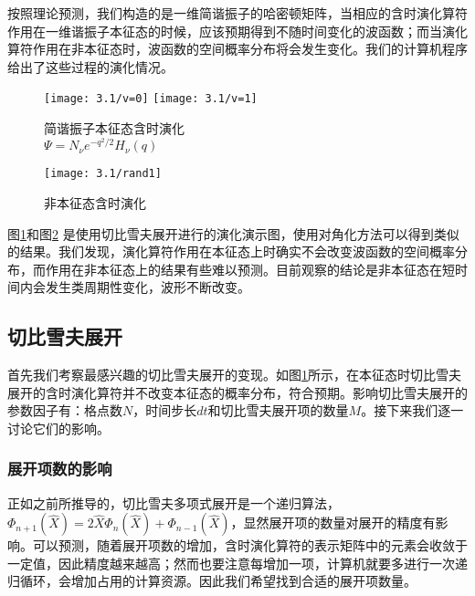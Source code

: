 按照理论预测，我们构造的是一维简谐振子的哈密顿矩阵，当相应的含时演化算符作用在一维谐振子本征态的时候，应该预期得到不随时间变化的波函数；而当演化算符作用在非本征态时，波函数的空间概率分布将会发生变化。我们的计算机程序给出了这些过程的演化情况。
\begin{figure}[hbt]
  \centering
  \captionsetup{justification=centering}
  \vspace{1mm}
  \texttt{[image: 3.1/v=0]}
  \texttt{[image: 3.1/v=1]}
  \caption{简谐振子本征态含时演化 \\
            $\Psi = N_{\nu}e^{-q^2/2}H_{\nu}(q)$ \label{fig:prop1}}
\end{figure}

\begin{figure}[hbt]
  \centering
  \captionsetup{justification=centering}
  \vspace{1mm}
  \texttt{[image: 3.1/rand1]}
  \caption{非本征态含时演化  \label{fig:prop2}}
\end{figure}

图\ref{fig:prop1}和图\ref{fig:prop2} 是使用切比雪夫展开进行的演化演示图，使用对角化方法可以得到类似的结果。我们发现，演化算符作用在本征态上时确实不会改变波函数的空间概率分布，而作用在非本征态上的结果有些难以预测。目前观察的结论是非本征态在短时间内会发生类周期性变化，波形不断改变。

\subsection{切比雪夫展开}
首先我们考察最感兴趣的切比雪夫展开的变现。如图\ref{fig:prop1}所示，在本征态时切比雪夫展开的含时演化算符并不改变本征态的概率分布，符合预期。影响切比雪夫展开的参数因子有：格点数$N$，时间步长$dt$和切比雪夫展开项的数量$M$。接下来我们逐一讨论它们的影响。

\subsubsection{展开项数的影响}
正如之前所推导的，切比雪夫多项式展开是一个递归算法，$\Phi_{n+1}(\hat{X}) = 2\hat{X}\Phi_{n}(\hat{X}) + \Phi_{n-1}(\hat{X})$，显然展开项的数量对展开的精度有影响。可以预测，随着展开项数的增加，含时演化算符的表示矩阵中的元素会收敛于一定值，因此精度越来越高；然而也要注意每增加一项，计算机就要多进行一次递归循环，会增加占用的计算资源。因此我们希望找到合适的展开项数量。

